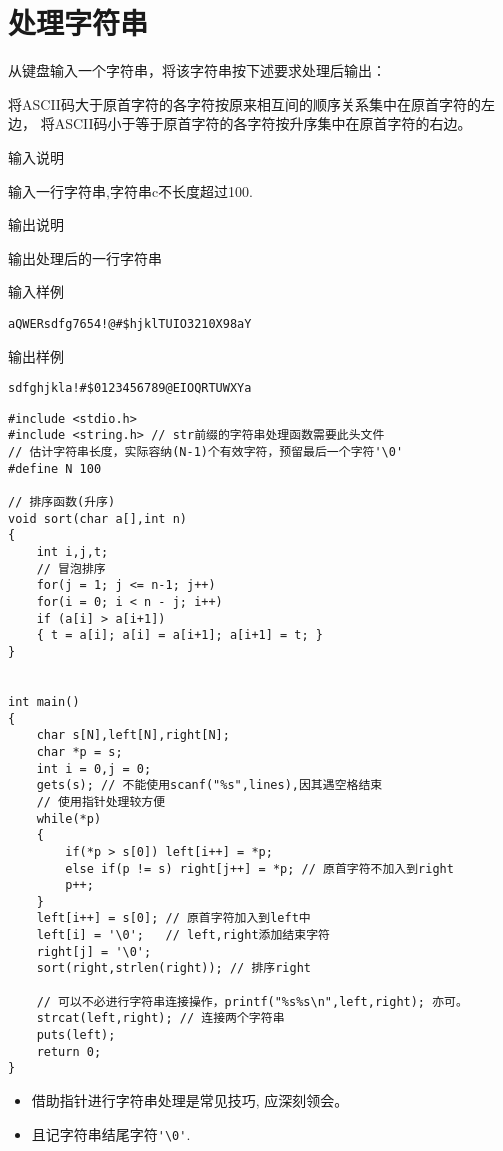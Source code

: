 \section{处理字符串}
从键盘输入一个字符串，将该字符串按下述要求处理后输出： 

将ASCII码大于原首字符的各字符按原来相互间的顺序关系集中在原首字符的左边，
将ASCII码小于等于原首字符的各字符按升序集中在原首字符的右边。

输入说明	

输入一行字符串,字符串c不长度超过100.

输出说明	

输出处理后的一行字符串

输入样例

\lstinline[mathescape=false]|aQWERsdfg7654!@#$hjklTUIO3210X98aY|

输出样例

\lstinline[mathescape=false]|sdfghjkla!#$0123456789@EIOQRTUWXYa|


\begin{lstlisting}
#include <stdio.h>
#include <string.h> // str前缀的字符串处理函数需要此头文件
// 估计字符串长度，实际容纳(N-1)个有效字符，预留最后一个字符'\0'  
#define N 100

// 排序函数(升序) 
void sort(char a[],int n)
{ 
	int i,j,t;
	// 冒泡排序
	for(j = 1; j <= n-1; j++) 
	for(i = 0; i < n - j; i++)
	if (a[i] > a[i+1]) 
	{ t = a[i]; a[i] = a[i+1]; a[i+1] = t; }
}


int main()
{
	char s[N],left[N],right[N];
	char *p = s;
	int i = 0,j = 0;
	gets(s); // 不能使用scanf("%s",lines),因其遇空格结束
	// 使用指针处理较方便 
	while(*p)
	{
		if(*p > s[0]) left[i++] = *p;
		else if(p != s) right[j++] = *p; // 原首字符不加入到right 
		p++; 
	}
	left[i++] = s[0]; // 原首字符加入到left中 
	left[i] = '\0';   // left,right添加结束字符 
	right[j] = '\0';
	sort(right,strlen(right)); // 排序right 
	
	// 可以不必进行字符串连接操作，printf("%s%s\n",left,right); 亦可。
	strcat(left,right); // 连接两个字符串 
	puts(left);
	return 0;
} 
\end{lstlisting}

\begin{note}[要点]
	\begin{itemize}
		\item 借助指针进行字符串处理是常见技巧, 应深刻领会。
		\item 且记字符串结尾字符\lstinline|'\0'|.
	\end{itemize}
\end{note}


